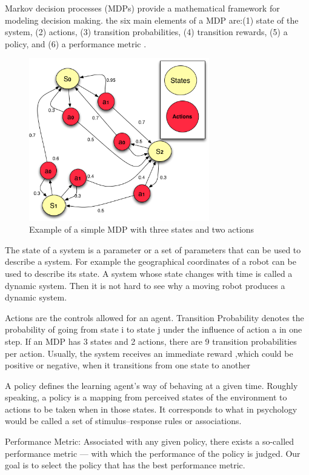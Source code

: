 Markov decision processes (MDPs) provide a mathematical framework for modeling decision making. the six main elements of a MDP are:(1) state of the system, (2) actions, (3) transition probabilities, (4) transition rewards, (5) a policy, and (6) a performance metric \cite{Sutton2012}.

\begin{figure}
\centering
\includegraphics[width=0.7\textwidth]{./images/mdp1.png}
\caption{Example of a simple MDP with three states and two actions}
\label{fig:mdp}
\end{figure}


The state of a system is a parameter or a set of parameters that can be used to describe a system. For example the geographical coordinates of a robot can be used to
describe its state. A system whose state changes with time is called a dynamic system. Then it is not hard to see why a moving robot produces a dynamic system.

Actions are the controls allowed for an agent. Transition Probability denotes the probability of going from state i to state j under the influence of action a in one step. If an MDP has 3 states and 2 actions, there are 9 transition probabilities per action. Usually, the system receives an immediate reward ,which could be positive or negative, when it transitions from one state to another

A policy defines the learning agent’s way of behaving at a given time. Roughly speaking, a policy is a mapping from perceived states of the environment
to actions to be taken when in those states. It corresponds to what in
psychology would be called a set of stimulus–response rules or associations.  

Performance Metric: Associated with any given policy, there exists a so-called performance
metric — with which the performance of the policy is judged. Our goal is to select the policy
that has the best performance metric. 

